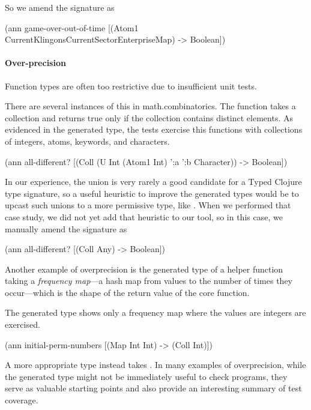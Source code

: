 So we amend the signature as

\begin{cljlisting}
(ann game-over-out-of-time
  [(Atom1 CurrentKlingonsCurrentSectorEnterpriseMap) 
   -> Boolean])
\end{cljlisting}


\paragraph{Over-precision}
Function types are often too restrictive due to
insufficient unit tests.

There are several instances of this in math.combinatorics.
The  function
takes a collection and returns true only if the collection
contains distinct elements.
As evidenced in the generated type, the tests exercise
this functions with collections of integers, atoms,
keywords, and characters.

\begin{cljlisting}
(ann all-different?
  [(Coll (U Int (Atom1 Int) ':a ':b Character)) 
   -> Boolean])
\end{cljlisting}

In our experience, the union is very rarely a good candidate
for a Typed Clojure type signature, so a useful heuristic to improve
the generated types would be to upcast such unions to a more permissive
type, like .
When we performed that case study, we did not yet add that heuristic
to our tool,
so in this case, we manually amend the signature as

\begin{cljlisting}
(ann all-different? [(Coll Any) -> Boolean])
\end{cljlisting}

Another example of overprecision is the generated type
of  a helper function
taking a \emph{frequency map}---a hash map from values
to the number of times they occur---which is the shape
of the return value of the core 
function.

The generated type shows only a frequency map where
the values are integers are exercised.
%
\begin{cljlisting}
(ann initial-perm-numbers
  [(Map Int Int) -> (Coll Int)])
\end{cljlisting}
%
A more appropriate type instead takes .
%
%
In many examples of overprecision, while the generated
type might not be immediately useful to check programs,
they serve as valuable starting points and also provide
an interesting summary of test coverage.

